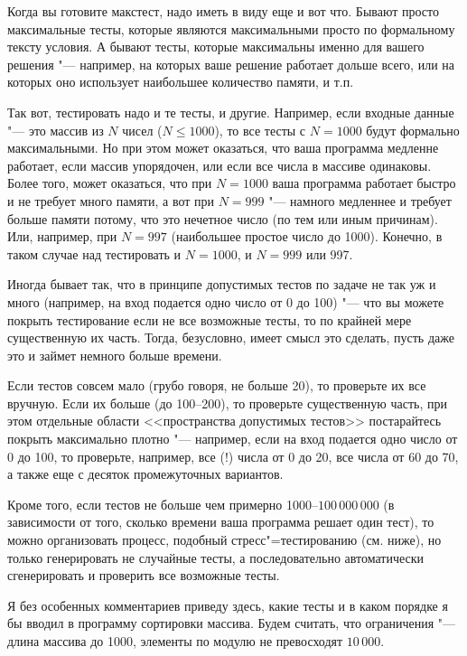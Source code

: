 \documentclass[a4paper,10pt]{problems}
\begin{document}
Когда вы готовите макстест, надо иметь в виду еще и вот что. 
Бывают просто максимальные тесты, которые являются максимальными просто по формальному тексту условия.
А бывают тесты, которые максимальны именно для вашего решения "--- например, на которых ваше решение работает дольше всего,
или на которых оно использует наибольшее количество памяти, и т.п.

Так вот, тестировать надо и те тесты, и другие. 
Например, если входные данные "--- это массив из $N$ чисел ($N\leq 1000$), то все тесты с $N=1000$ будут формально максимальными.
Но при этом может оказаться, что ваша программа медленне работает, если массив упорядочен, или если все числа в массиве одинаковы.
Более того, может оказаться, что при $N=1000$ ваша программа работает быстро и не требует много памяти, а вот при $N=999$ "--- 
намного медленнее и требует больше памяти потому, что это нечетное число (по тем или иным причинам). Или, например, при $N=997$ 
(наибольшее простое число до 1000). Конечно, в таком случае над тестировать и $N=1000$, и $N=999$ или 997.

Иногда бывает так, что в принципе допустимых тестов по задаче не так уж и много (например, на вход подается одно число от 0 до 100)
"--- что вы можете покрыть тестирование если не все возможные тесты, то по крайней мере существенную их часть.
Тогда, безусловно, имеет смысл это сделать, пусть даже это и займет немного больше времени. 

Если тестов совсем мало (грубо говоря, не больше 20), то проверьте их все вручную. 
Если их больше (до 100--200), то проверьте существенную часть, при этом отдельные области <<пространства допустимых тестов>> постарайтесь покрыть
максимально плотно "--- например, если на вход подается одно число от 0 до 100, то проверьте, например, все (!) числа от 0 до 20, 
все числа от 60 до 70, а также еще с десяток промежуточных вариантов.

Кроме того, если тестов не больше чем примерно 1000--$100\,000\,000$ (в зависимости от того, сколько времени ваша программа решает один тест),
то можно организовать процесс, подобный стресс"=тестированию (см. ниже), но только генерировать не случайные тесты, 
а последовательно автоматически сгенерировать и проверить все возможные тесты.

Я без особенных комментариев приведу здесь, какие тесты и в каком порядке я бы вводил в программу сортировки массива. 
Будем считать, что ограничения "--- длина массива до 1000, элементы по модулю не превосходят $10\,000$.
\end{document}
